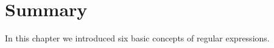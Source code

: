 \begin{comment}
\section{Example: Text mining the State of the Union Addresses}

Text Mining: Stem and remove stop words and create a word vector or a
bag of words for further analysis.
  
\begin{quote}
  Thank you very much. And tonight, I have a high privilege and
  distinct honor of my own -- as the first President to begin the
  State of the Union message with these words: Madam Speaker.
\end{quote}
\end{comment}

%

\section{Summary}
In this chapter we introduced six basic concepts of regular expressions.

